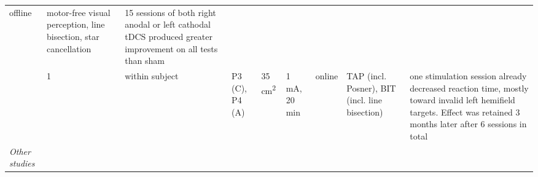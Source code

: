 \documentclass[11pt,]{memoir}
\begin{document}
\begin{longtable}[]{@{}lllllllll@{}}
\begin{minipage}[t]{0.04\columnwidth}
offline\strut
\end{minipage} & \begin{minipage}[t]{0.10\columnwidth}\raggedright
motor-free visual
perception, line
bisection, star
cancellation\strut
\end{minipage} & \begin{minipage}[t]{0.28\columnwidth}\raggedright
15 sessions of both right anodal or left cathodal tDCS
produced greater improvement on all tests than sham\strut
\end{minipage}\tabularnewline
\begin{minipage}[t]{0.09\columnwidth}\raggedright
\textcite{Brem2014}\strut
\end{minipage} & \begin{minipage}[t]{0.02\columnwidth}\raggedright
1\strut
\end{minipage} & \begin{minipage}[t]{0.04\columnwidth}\raggedright
within
subject\strut
\end{minipage} & \begin{minipage}[t]{0.10\columnwidth}\raggedright
P3 (C), P4 (A)\strut
\end{minipage} & \begin{minipage}[t]{0.04\columnwidth}\raggedright
35
cm\textsuperscript{2}\strut
\end{minipage} & \begin{minipage}[t]{0.04\columnwidth}\raggedright
1 mA,
20 min\strut
\end{minipage} & \begin{minipage}[t]{0.04\columnwidth}\raggedright
online\strut
\end{minipage} & \begin{minipage}[t]{0.10\columnwidth}\raggedright
TAP (incl. Posner),
BIT (incl. line
bisection)\strut
\end{minipage} & \begin{minipage}[t]{0.28\columnwidth}\raggedright
one stimulation session already decreased reaction time,
mostly toward invalid left hemifield targets. Effect was
retained 3 months later after 6 sessions in total\strut
\end{minipage}\tabularnewline
\begin{minipage}[t]{0.09\columnwidth}\raggedright
\emph{Other studies}\strut
\end{minipage} & \begin{minipage}[t]{0.02\columnwidth}\raggedright
\strut
\end{minipage} & \begin{minipage}[t]{0.04\columnwidth}\raggedright

\end{minipage}
\end{longtable}
\end{document}
